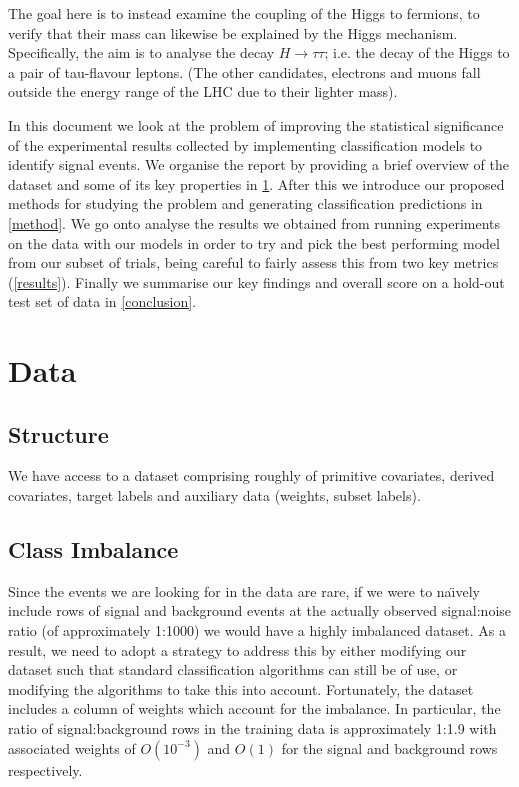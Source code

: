 The goal here is to instead examine the coupling of the Higgs to fermions, to verify that their mass can likewise be explained by the Higgs mechanism. Specifically, the aim is to analyse the decay $H\rightarrow\tau\tau$; i.e. the decay of the Higgs to a pair of tau-flavour leptons. (The other candidates, electrons and muons fall outside the energy range of the LHC due to their lighter mass).

In this document we look at the problem of improving the statistical significance of the experimental results collected by implementing classification models to identify signal events. We organise the report by providing a brief overview of the dataset and some of its key properties in \ref{data}. After this we introduce our proposed methods for studying the problem and generating classification predictions in \ref{method}. We go onto analyse the results we obtained from running experiments on the data with our models in order to try and pick the best performing model from our subset of trials, being careful to fairly assess this from two key metrics (\ref{results}). Finally we summarise our key findings and overall score on a hold-out test set of data in \ref{conclusion}.

\section{Data}
\label{data}
\subsection{Structure}
We have access to a dataset comprising roughly of primitive covariates, derived covariates, target labels and auxiliary data (weights, subset labels). 

\subsection{Class Imbalance}
Since the events we are looking for in the data are rare, if we were to na\"{\i}vely include rows of signal and background events at the actually observed signal:noise ratio (of approximately 1:1000) we would have a highly imbalanced dataset. As a result, we need to adopt a strategy to address this by either modifying our dataset such that standard classification algorithms can still be of use, or modifying the algorithms to take this into account. Fortunately, the dataset includes a column of weights which account for the imbalance. In particular, the ratio of signal:background rows in the training data is approximately 1:1.9 with associated weights of $O(10^{-3})$ and $O(1)$ for the signal and background rows respectively.

